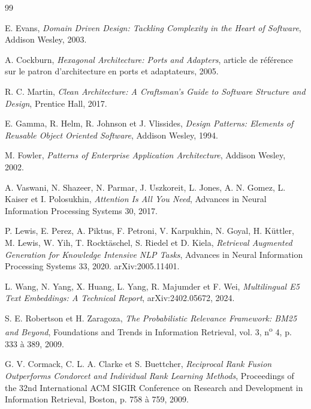 
\begin{thebibliography}{99}

E. Evans, \textit{Domain Driven Design: Tackling Complexity in the Heart of Software},
Addison Wesley, 2003.

A. Cockburn, \textit{Hexagonal Architecture: Ports and Adapters},
article de référence sur le patron d'architecture en ports et adaptateurs, 2005.

R. C. Martin, \textit{Clean Architecture: A Craftsman's Guide to Software Structure and Design},
Prentice Hall, 2017.

E. Gamma, R. Helm, R. Johnson et J. Vlissides,
\textit{Design Patterns: Elements of Reusable Object Oriented Software},
Addison Wesley, 1994.

M. Fowler, \textit{Patterns of Enterprise Application Architecture},
Addison Wesley, 2002.

A. Vaswani, N. Shazeer, N. Parmar, J. Uszkoreit, L. Jones, A. N. Gomez, L. Kaiser et I. Polosukhin,
\textit{Attention Is All You Need},
Advances in Neural Information Processing Systems 30, 2017.

P. Lewis, E. Perez, A. Piktus, F. Petroni, V. Karpukhin, N. Goyal, H. Küttler, M. Lewis,
W. Yih, T. Rocktäschel, S. Riedel et D. Kiela,
\textit{Retrieval Augmented Generation for Knowledge Intensive NLP Tasks},
Advances in Neural Information Processing Systems 33, 2020. arXiv:2005.11401.

L. Wang, N. Yang, X. Huang, L. Yang, R. Majumder et F. Wei,
\textit{Multilingual E5 Text Embeddings: A Technical Report},
arXiv:2402.05672, 2024.

S. E. Robertson et H. Zaragoza,
\textit{The Probabilistic Relevance Framework: BM25 and Beyond},
Foundations and Trends in Information Retrieval, vol. 3, n\textsuperscript{o} 4, p. 333 à 389, 2009.

G. V. Cormack, C. L. A. Clarke et S. Buettcher,
\textit{Reciprocal Rank Fusion Outperforms Condorcet and Individual Rank Learning Methods},
Proceedings of the 32nd International ACM SIGIR Conference on Research and Development in
Information Retrieval, Boston, p. 758 à 759, 2009.


\end{thebibliography}
